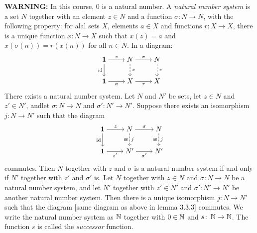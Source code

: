 \linebreak\textbf{WARNING:} In this course, $0$ is a natural number.
 A \textit{natural number system} is a set $N$ together with an element $z \in N$ and a function $\sigma \colon N \to N$, with the following property: for alal sets $X$, elements $a \in X$ and functions $r \colon X \to X$, there is a unique function $x \colon N \to X$ such that $x(z) = a$ and $x(\sigma(n)) = r(x(n))$ for all $n \in N$. In a diagram:
\[\begin{tikzcd}[cramped]
	{\mathbf{1}} & N & N \\
	{\mathbf{1}} & X & X
	\arrow["z", from=1-1, to=1-2]
	\arrow["{\text{id}}"', from=1-1, to=2-1]
	\arrow["\sigma", from=1-2, to=1-3]
	\arrow["x", dashed, from=1-2, to=2-2]
	\arrow["x", dashed, from=1-3, to=2-3]
	\arrow["a"', from=2-1, to=2-2]
	\arrow["r"', from=2-2, to=2-3]
\end{tikzcd}\]
 There exists a natural number system.
 Let $N$ and $N'$ be sets, let $z \in N$ and $z' \in N'$, andlet $\sigma \colon N \to N$ and $\sigma' \colon N' \to N'$. Suppose there exists an isomorphism $j \colon N \to N'$ such that the diagram
\[\begin{tikzcd}[cramped]
	{\mathbf{1}} & N & N \\
	{\mathbf{1}} & {N'} & {N'}
	\arrow["z", from=1-1, to=1-2]
	\arrow["{\text{id}}"', from=1-1, to=2-1]
	\arrow["\sigma", from=1-2, to=1-3]
	\arrow["j", "\cong"', dashed, from=1-2, to=2-2]
	\arrow["j", "\cong"', dashed, from=1-3, to=2-3]
	\arrow["{z'}"', from=2-1, to=2-2]
	\arrow["{\sigma'}"', from=2-2, to=2-3]
\end{tikzcd}\]
commutes. Then $N$ together with $z$ and $\sigma$ is a natural number system if and only if $N'$ together with $z'$ and $\sigma'$ is.
 Let $N$ together with $z \in N$ and $\sigma \colon N \to N$ be a natural number system, and let $N'$ together with $z' \in N'$ and $\sigma' \colon N' \to N'$ be another natural number system. Then there is a unique isomorphism $j \colon N \to N'$ such that the diagram [same diagram as above in lemma 3.3.3] commutes.
 We write the natural number system as $\operatorname{\mathbb{N}}$ together with $0 \in \operatorname{\mathbb{N}}$ and $s \colon \operatorname{\mathbb{N}} \to \operatorname{\mathbb{N}}$. The function $s$ is called the \textit{successor} function.